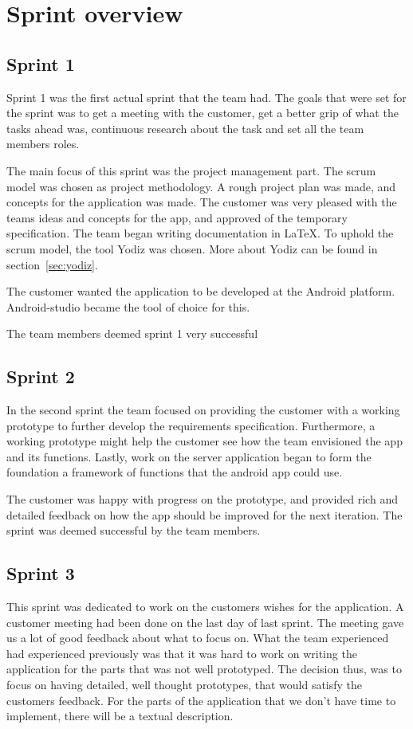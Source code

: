 \section{Sprint overview}


\subsection{Sprint 1}
Sprint 1 was the first actual sprint that the team had. The goals that were set for the sprint was to get a meeting with the customer, get a better grip of what the tasks ahead was, continuous research about the task and set all the team members roles.

The main focus of this sprint was the project management part. The scrum model was chosen as project methodology. A rough project plan was made, and concepts for the application was made.
The customer was very pleased with the teams ideas and concepts for the app, and approved of the temporary specification. The team began writing documentation in \LaTeX. To uphold the scrum model, the tool Yodiz was chosen. More about Yodiz can be found in section~\ref{sec:yodiz}.

The customer wanted the application to be developed at the Android platform. Android-studio became the tool of choice for this.

The team members deemed sprint 1 very successful

\subsection{Sprint 2}
In the second sprint the team focused on providing the customer with a working
prototype to further develop the requirements specification. Furthermore, a
working prototype might help the customer see how the team envisioned the app
and its functions. Lastly, work on the server application began to form the
foundation a framework of functions that the android app could use.

The customer was happy with progress on the prototype, and provided rich and detailed feedback on how the app should be improved for the next iteration. The sprint was deemed successful by the team members.

\subsection{Sprint 3}
This sprint was dedicated to work on the customers wishes for the application. A customer meeting had been done on the last day of last sprint. The meeting gave us a lot of good feedback about what to focus on. What the team experienced had experienced previously was that it was hard to work on writing the application for the parts that was not well prototyped.
The decision thus, was to focus on having detailed, well thought prototypes, that would satisfy the customers feedback. For the parts of the application that we don't have time to implement, there will be a textual description.

